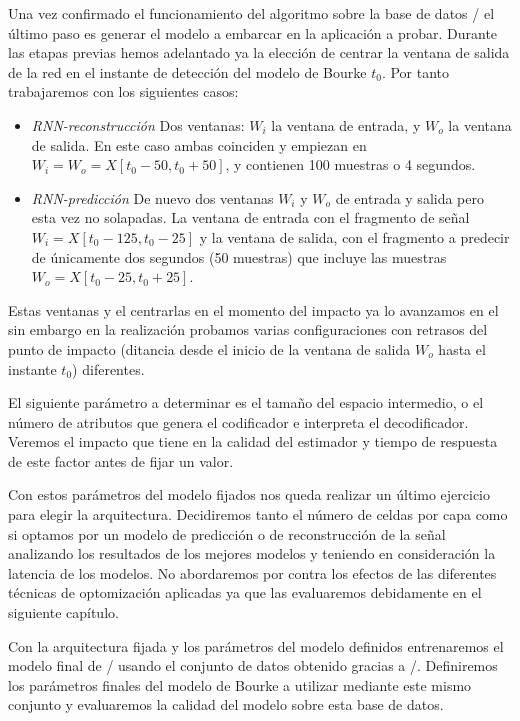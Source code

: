 Una vez confirmado el funcionamiento del algoritmo sobre la base de datos \ifell/ el último paso es generar el modelo a embarcar en la aplicación a probar. Durante las etapas previas hemos adelantado ya la elección de centrar la ventana de salida de la red en el instante de detección del modelo de Bourke $t_0$. Por tanto trabajaremos con los siguientes casos:
  \begin{itemize}
    \item \textit{RNN-reconstrucción} Dos ventanas: $W_i$ la ventana de entrada, y $W_o$ la ventana de salida. En este caso ambas coinciden y empiezan en $W_i=W_o=X[t_0-50, t_0+50]$, y contienen 100 muestras o 4 segundos.
    \item \textit{RNN-predicción} De nuevo dos ventanas $W_i$ y $W_o$ de entrada y salida pero esta vez no solapadas. La ventana de entrada con el fragmento de señal $W_i=X[t_0-125,t_0-25]$ y la ventana de salida, con el fragmento a predecir de únicamente dos segundos (50 muestras) que incluye las muestras $W_o=X[t_0-25, t_0+25]$.
  \end{itemize}

  Estas ventanas y el centrarlas en el momento del impacto ya lo avanzamos en el  sin embargo en la realización probamos varias configuraciones con retrasos del punto de impacto (ditancia desde el inicio de la ventana de salida $W_o$ hasta el instante $t_0$) diferentes. 

  El siguiente parámetro a determinar es el tamaño del espacio intermedio, o el número de atributos que genera el codificador e interpreta el decodificador. Veremos el impacto que tiene en la calidad del estimador y tiempo de respuesta de este factor antes de fijar un valor.

  Con estos parámetros del modelo fijados nos queda realizar un último ejercicio para elegir la arquitectura. Decidiremos tanto el número de celdas por capa como si optamos por un modelo de predicción o de reconstrucción de la señal analizando los resultados de los mejores modelos y teniendo en consideración la latencia de los modelos. No abordaremos por contra los efectos de las diferentes técnicas de optomización aplicadas ya que las evaluaremos debidamente en el siguiente capítulo.

  Con la arquitectura fijada y los parámetros del modelo definidos entrenaremos el modelo final de \ifell/ usando el conjunto de datos obtenido gracias a \accelcapture/. Definiremos los parámetros finales del modelo de Bourke a utilizar mediante este mismo conjunto y evaluaremos la calidad del modelo sobre esta base de datos.

